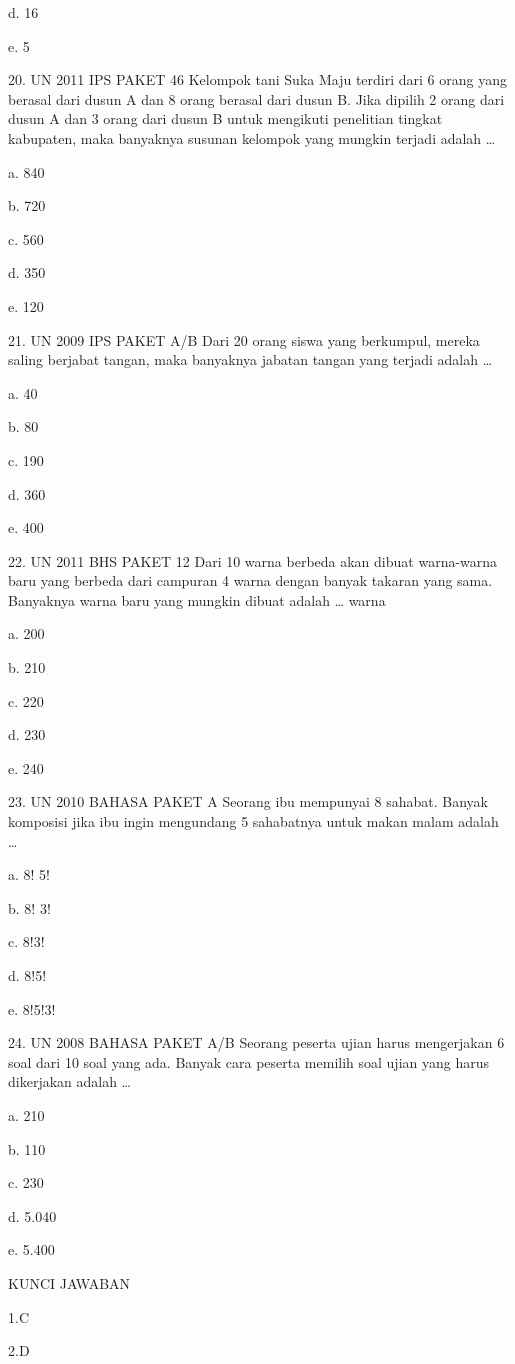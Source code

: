 \documentclass[11pt,fleqn]{book} %
\begin{document}
d.	16

e.	5

20.	UN 2011 IPS PAKET 46 
Kelompok tani Suka Maju terdiri dari 6 orang yang berasal dari dusun A dan 8 orang berasal dari dusun B. Jika dipilih 2 orang dari dusun A dan 3 orang dari dusun B untuk mengikuti penelitian tingkat kabupaten, maka banyaknya susunan kelompok yang mungkin terjadi adalah …

a.	840

b.	720

c.	560

d.	350

e.	120

21.	UN 2009 IPS PAKET A/B 
Dari 20 orang siswa yang berkumpul, mereka saling berjabat tangan, maka banyaknya jabatan tangan yang terjadi adalah …

a.	40

b.	80


c.	190

d.	360

e.	400

22.	UN 2011 BHS PAKET 12 
Dari 10 warna berbeda akan dibuat warna-warna baru yang berbeda dari campuran 4 warna dengan banyak takaran yang sama. Banyaknya warna baru yang mungkin dibuat adalah … warna

a.	200

b.	210

c.	220

d.	230

e.	240

23.	UN 2010 BAHASA PAKET A 
Seorang ibu mempunyai 8 sahabat. Banyak komposisi jika ibu ingin mengundang 5 sahabatnya untuk makan malam adalah …

a.	8! 5! 

b.	8! 3! 

c.	8!3!

d.	8!5!

e.	8!5!3!

24.	UN 2008 BAHASA PAKET A/B 
Seorang peserta ujian harus mengerjakan 6 soal dari 10 soal yang ada. Banyak cara peserta memilih soal ujian yang harus dikerjakan adalah …

a.	210

b.	110

c.	230

d.	5.040

e.	5.400 


KUNCI JAWABAN

1.C

2.D
\end{document}
